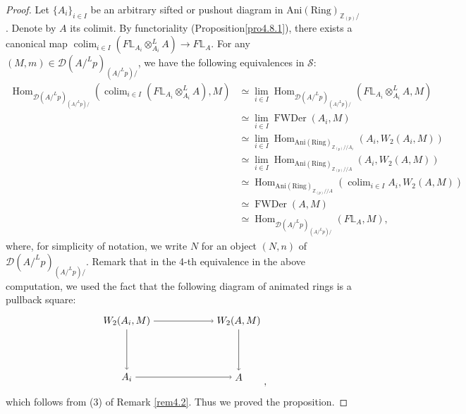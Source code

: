 \documentclass[10pt,a4paper]{amsart}
\begin{document}
\begin{proof}
Let $\{A_i\}_{i\in I}$ be an arbitrary sifted or pushout diagram in $\operatorname{Ani(Ring)}_{\mathbb Z_{(p)}/}$. Denote by $A$ its colimit. By functoriality (Proposition\ref{pro4.8.1}), there exists a canonical map $\operatorname{colim}_{i\in I}(F\mathbb L_{A_i}\otimes^L_{A_i}A)\to F\mathbb L_A$. For any $(M,m)\in \mathcal D(A/^Lp)_{(A/^Lp)/}$, we have the following equivalences in $\mathcal S$:\begin{align*}
    \operatorname{Hom}_{\mathcal D(A/^Lp)_{(A/^Lp)/}}(\operatorname{colim}_{i\in I}(F\mathbb L_{A_i}\otimes^L_{A_i}A),M)&\simeq \operatorname{lim}_{i\in I}\operatorname{Hom}_{\mathcal D(A/^Lp)_{(A/^Lp)/}}(F\mathbb L_{A_i}\otimes^L_{A_i}A,M)\\
    &\simeq \operatorname{lim}_{i\in I}\operatorname{FWDer}(A_i,M)\\
    &\simeq \operatorname{lim}_{i\in I}\operatorname{Hom}_{\operatorname{Ani(Ring)}_{\mathbb Z_{(p)}//A_i}}(A_i,W_2(A_i,M))\\
    &\simeq \operatorname{lim}_{i\in I}\operatorname{Hom}_{\operatorname{Ani(Ring)}_{\mathbb Z_{(p)}//A}}(A_i,W_2(A,M))\\
    &\simeq \operatorname{Hom}_{\operatorname{Ani(Ring)}_{\mathbb Z_{(p)}//A}}(\operatorname{colim}_{i\in I} A_i,W_2(A,M))\\
    &\simeq \operatorname{FWDer}(A,M)\\
    &\simeq \operatorname{Hom}_{\mathcal D(A/^Lp)_{(A/^Lp)/}}(F\mathbb L_A,M), 
\end{align*}
where, for simplicity of notation, we write $N$ for an object $(N,n)$ of $\mathcal D(A/^Lp)_{(A/^Lp)/}$. Remark that in the 4-th equivalence in the above computation, we used the fact that the following diagram of animated rings is a pullback square:
\[ \begin{tikzpicture}[auto]
\node (a) at (0, 2) {$W_2(A_i,M)$}; \node (x) at (4, 2) {$W_2(A,M)$};
\node (b) at (0, 0) {$A_i$};   \node (y) at (4, 0) {$A$};
\draw[->] (a) to node {$\scriptstyle $} (x);
\draw[->] (x) to node {$\scriptstyle $} (y);
\draw[->] (a) to node[swap] {$\scriptstyle $} (b);
\draw[->] (b) to node[swap] {$\scriptstyle $} (y);
\end{tikzpicture},\]
which follows from (3) of Remark \ref{rem4.2}. Thus we proved the proposition.
\end{proof}
\end{document}
